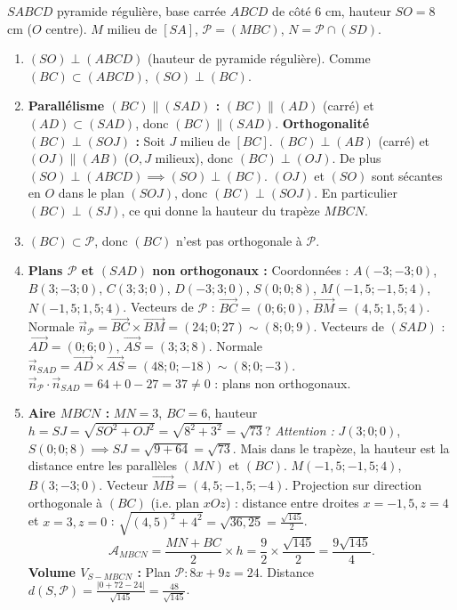 \documentclass[11pt]{article}
\begin{document}
\begin{corrige}
$SABCD$ pyramide régulière, base carrée $ABCD$ de côté $6$ cm, hauteur $SO=8$ cm ($O$ centre). $M$ milieu de $[SA]$, $\mathcal{P}=(MBC)$, $N = \mathcal{P}\cap(SD)$.
\begin{enumerate}
\item $(SO)\perp(ABCD)$ (hauteur de pyramide régulière). Comme $(BC)\subset(ABCD)$, $(SO)\perp(BC)$.
\item \textbf{Parallélisme $(BC)\parallel(SAD)$ :} $(BC)\parallel(AD)$ (carré) et $(AD)\subset(SAD)$, donc $(BC)\parallel(SAD)$.
\textbf{Orthogonalité $(BC)\perp(SOJ)$ :} Soit $J$ milieu de $[BC]$. $(BC)\perp(AB)$ (carré) et $(OJ)\parallel(AB)$ ($O,J$ milieux), donc $(BC)\perp(OJ)$. De plus $(SO)\perp(ABCD) \implies (SO)\perp(BC)$. $(OJ)$ et $(SO)$ sont sécantes en $O$ dans le plan $(SOJ)$, donc $(BC)\perp(SOJ)$. En particulier $(BC)\perp(SJ)$, ce qui donne la hauteur du trapèze $MBCN$.
\item $(BC)\subset\mathcal{P}$, donc $(BC)$ n'est pas orthogonale à $\mathcal{P}$.
\item \textbf{Plans $\mathcal{P}$ et $(SAD)$ non orthogonaux :} Coordonnées : $A(-3;-3;0)$, $B(3;-3;0)$, $C(3;3;0)$, $D(-3;3;0)$, $S(0;0;8)$, $M(-1,5;-1,5;4)$, $N(-1,5;1,5;4)$.
Vecteurs de $\mathcal{P}$ : $\overrightarrow{BC}=(0;6;0)$, $\overrightarrow{BM}=(4,5;1,5;4)$. Normale $\vec{n}_{\mathcal{P}} = \overrightarrow{BC}\times\overrightarrow{BM} = (24;0;27) \sim (8;0;9)$.
Vecteurs de $(SAD)$ : $\overrightarrow{AD}=(0;6;0)$, $\overrightarrow{AS}=(3;3;8)$. Normale $\vec{n}_{SAD} = \overrightarrow{AD}\times\overrightarrow{AS} = (48;0;-18) \sim (8;0;-3)$.
$\vec{n}_{\mathcal{P}}\cdot\vec{n}_{SAD} = 64 + 0 - 27 = 37 \neq 0$ : plans non orthogonaux.
\item \textbf{Aire $MBCN$ :} $MN=3$, $BC=6$, hauteur $h = SJ = \sqrt{SO^2+OJ^2} = \sqrt{8^2+3^2} = \sqrt{73}$? \emph{Attention :} $J(3;0;0)$, $S(0;0;8) \implies SJ = \sqrt{9+64}=\sqrt{73}$. Mais dans le trapèze, la hauteur est la distance entre les parallèles $(MN)$ et $(BC)$. $M(-1,5;-1,5;4)$, $B(3;-3;0)$. Vecteur $\overrightarrow{MB}=(4,5;-1,5;-4)$. Projection sur direction orthogonale à $(BC)$ (i.e. plan $xOz$) : distance entre droites $x=-1,5, z=4$ et $x=3, z=0$ : $\sqrt{(4,5)^2+4^2} = \sqrt{36,25} = \frac{\sqrt{145}}{2}$.
\[ \mathcal{A}_{MBCN} = \frac{MN+BC}{2}\times h = \frac{9}{2}\times\frac{\sqrt{145}}{2} = \frac{9\sqrt{145}}{4}. \]
\textbf{Volume $V_{S-MBCN}$ :} Plan $\mathcal{P} : 8x+9z=24$. Distance $d(S,\mathcal{P}) = \frac{|0+72-24|}{\sqrt{145}} = \frac{48}{\sqrt{145}}$.

\end{enumerate}
\end{corrige}
\end{document}
